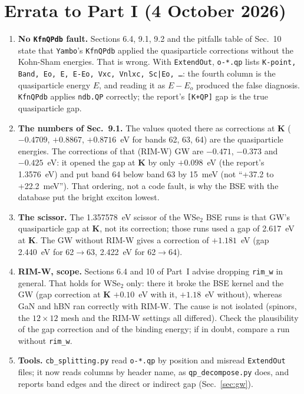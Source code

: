 \documentclass[10pt,a4paper]{article}
\newcommand{\bK}{\mathbf{K}}
\begin{document}
\section*{Errata to Part I (4 October 2026)}
\begin{enumerate}[nosep,leftmargin=1.4em]
\item \textbf{No \texttt{KfnQPdb} fault.} Sections 6.4, 9.1, 9.2 and the pitfalls
table of Sec.~10 state that \texttt{Yambo}'s \texttt{KfnQPdb} applied the
quasiparticle corrections without the Kohn-Sham energies. That is wrong. With
\texttt{ExtendOut}, \texttt{o-*.qp} lists \texttt{K-point, Band, Eo, E, E-Eo,
Vxc, Vnlxc, Sc|Eo, \ldots}: the fourth column is the quasiparticle energy $E$,
and reading it as $E-E_o$ produced the false diagnosis. \texttt{KfnQPdb} applies
\texttt{ndb.QP} correctly; the report's \texttt{[K+QP]} gap is the true
quasiparticle gap.
\item \textbf{The numbers of Sec.~9.1.} The values quoted there as corrections
at $\bK$ ($-0.4709$, $+0.8867$, $+0.8716$~eV for bands 62, 63, 64) are the
quasiparticle energies. The corrections of that (RIM-W) GW are $-0.471$,
$-0.373$ and $-0.425$~eV: it opened the gap at $\bK$ by only $+0.098$~eV (the
report's 1.3576~eV) and put band 64 below band 63 by 15~meV (not ``+37.2 to
+22.2~meV''). That ordering, not a code fault, is why the BSE with the database
put the bright exciton lowest.
\item \textbf{The scissor.} The 1.357578~eV scissor of the WSe$_2$ BSE runs is that
GW's quasiparticle gap at $\bK$, not its correction; those runs used a gap of
2.617~eV at $\bK$. The GW without RIM-W gives a correction of $+1.181$~eV
(gap 2.440~eV for 62$\to$63, 2.422~eV for 62$\to$64).
\item \textbf{RIM-W, scope.} Sections 6.4 and 10 of Part~I advise dropping
\texttt{rim\_w} in general. That holds for WSe$_2$ only: there it broke the BSE
kernel and the GW (gap correction at $\bK$ $+0.10$~eV with it, $+1.18$~eV without),
whereas GaN and hBN ran correctly with RIM-W. The cause is not isolated (spinors,
the $12\times12$ mesh and the RIM-W settings all differed). Check the plausibility
of the gap correction and of the binding energy; if in doubt, compare a run
without \texttt{rim\_w}.
\item \textbf{Tools.} \texttt{cb\_splitting.py} read \texttt{o-*.qp} by position and
misread \texttt{ExtendOut} files; it now reads columns by header name, as
\texttt{qp\_decompose.py} does, and reports band edges and the direct or indirect
gap (Sec.~\ref{sec:gw}).
\end{enumerate}
\end{document}
